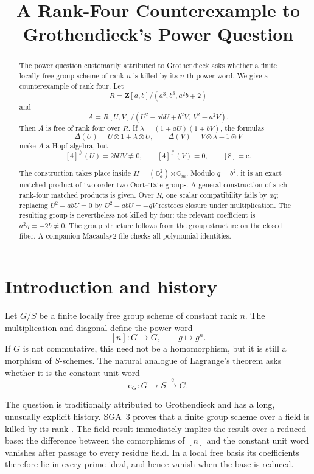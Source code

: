 \documentclass[11pt]{amsart}
\title[A rank-four counterexample]
      {A Rank-Four Counterexample to\\
       Grothendieck's Power Question}
\author{}
\date{}
\theoremstyle{remark}
\newcommand{\Z}{\mathbf Z}
\newcommand{\Ga}{\mathbb G_a}
\newcommand{\Gm}{\mathbb G_m}
\newcommand{\ot}{\otimes}
\newcommand{\unit}{\mathrm e}
\begin{document}
\begin{abstract}
The power question customarily attributed to Grothendieck asks whether a
finite locally free group scheme of rank \(n\) is killed by its
\(n\)-th power word.  We give a counterexample of rank four.  Let
\[
 R=\Z[a,b]/(a^3,b^3,a^2b+2)
\]
and
\[
 A=R[U,V]/(U^2-abU+b^2V,\ V^2-a^2V).
\]
Then \(A\) is free of rank four over \(R\).  If
\(\lambda=(1+aU)(1+bV)\), the formulas
\[
 \Delta(U)=U\ot1+\lambda\ot U,\qquad
 \Delta(V)=V\ot\lambda+1\ot V
\]
make \(A\) a Hopf algebra, but
\[
 [4]^\#(U)=2bUV\ne0,\qquad [4]^\#(V)=0,\qquad [8]=\unit.
\]

The construction takes place inside
\(H=(\Ga^2)\rtimes\Gm\).  Modulo \(q=b^2\), it is an exact matched
product of two order-two Oort--Tate groups.  A general construction of
such rank-four matched products is given.  Over \(R\), one scalar
compatibility fails by \(aq\); replacing
\(U^2-abU=0\) by \(U^2-abU=-qV\) restores closure under multiplication.
The resulting group is nevertheless not killed by four: the relevant
coefficient is \(a^2q=-2b\ne0\).
The group structure follows from the group structure on the closed
fiber.  A companion Macaulay2 file checks all polynomial identities.
\end{abstract}

\maketitle

\section{Introduction and history}

Let \(G/S\) be a finite locally free group scheme of constant rank \(n\).
The multiplication and diagonal define the power word
\[
 [n]\colon G\longrightarrow G,\qquad g\longmapsto g^n.
\]
If \(G\) is not commutative, this need not be a homomorphism, but it is
still a morphism of \(S\)-schemes.  The natural analogue of Lagrange's
theorem asks whether it is the constant unit word
\[
 \unit_G:G\longrightarrow S\stackrel{\unit}{\longrightarrow}G.
\]

The question is traditionally attributed to Grothendieck and has a long,
unusually explicit history.  SGA~3 proves that a finite group scheme over
a field is killed by its rank
\cite[Exp.~VIIA, Prop.~8.5]{SGA3I}.  The field result immediately
implies the result over a reduced base: the difference between the
comorphisms of \([n]\) and the constant unit word vanishes after passage
to every residue field.  In a local free basis its coefficients
therefore lie in every prime ideal, and hence vanish when the base is
reduced.
\end{document}
